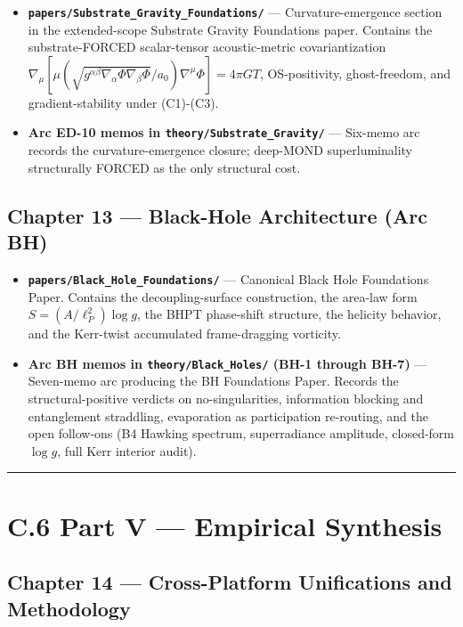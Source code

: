 \documentclass[11pt]{book}
\begin{document}
\begin{itemize}
\item \textbf{\texttt{papers/Substrate\_Gravity\_Foundations/}} — Curvature-emergence section in the extended-scope Substrate Gravity Foundations paper. Contains the substrate-FORCED scalar-tensor acoustic-metric covariantization $\nabla_\mu[\mu(\sqrt{g^{\alpha\beta}\nabla_\alpha\Phi\nabla_\beta\Phi}/a_0)\nabla^\mu\Phi] = 4\pi GT$, OS-positivity, ghost-freedom, and gradient-stability under (C1)-(C3).
\item \textbf{Arc ED-10 memos in \texttt{theory/Substrate\_Gravity/}} — Six-memo arc records the curvature-emergence closure; deep-MOND superluminality structurally FORCED as the only structural cost.
\end{itemize}

\subsection{Chapter 13 — Black-Hole Architecture (Arc BH)}

\begin{itemize}
\item \textbf{\texttt{papers/Black\_Hole\_Foundations/}} — Canonical Black Hole Foundations Paper. Contains the decoupling-surface construction, the area-law form $S = (A/\ell_P^2)\log g$, the BHPT phase-shift structure, the helicity behavior, and the Kerr-twist accumulated frame-dragging vorticity.
\item \textbf{Arc BH memos in \texttt{theory/Black\_Holes/} (BH-1 through BH-7)} — Seven-memo arc producing the BH Foundations Paper. Records the structural-positive verdicts on no-singularities, information blocking and entanglement straddling, evaporation as participation re-routing, and the open follow-ons (B4 Hawking spectrum, superradiance amplitude, closed-form $\log g$, full Kerr interior audit).
\end{itemize}

\bigskip\hrule\bigskip

\section{C.6 Part V — Empirical Synthesis}

\subsection{Chapter 14 — Cross-Platform Unifications and Methodology}
\end{document}
